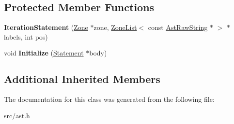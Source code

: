 \subsection*{Protected Member Functions}
\begin{DoxyCompactItemize}
\item 
\hypertarget{classv8_1_1internal_1_1_iteration_statement_a7eb4203fde9d55c8a422f5f69256f3ad}{}{\bfseries Iteration\+Statement} (\hyperlink{classv8_1_1internal_1_1_zone}{Zone} $\ast$zone, \hyperlink{classv8_1_1internal_1_1_zone_list}{Zone\+List}$<$ const \hyperlink{classv8_1_1internal_1_1_ast_raw_string}{Ast\+Raw\+String} $\ast$ $>$ $\ast$labels, int pos)\label{classv8_1_1internal_1_1_iteration_statement_a7eb4203fde9d55c8a422f5f69256f3ad}

\item 
\hypertarget{classv8_1_1internal_1_1_iteration_statement_a6a313ad237f5b93a69bd3db590872865}{}void {\bfseries Initialize} (\hyperlink{classv8_1_1internal_1_1_statement}{Statement} $\ast$body)\label{classv8_1_1internal_1_1_iteration_statement_a6a313ad237f5b93a69bd3db590872865}

\end{DoxyCompactItemize}
\subsection*{Additional Inherited Members}


The documentation for this class was generated from the following file\+:\begin{DoxyCompactItemize}
\item 
src/ast.\+h\end{DoxyCompactItemize}
